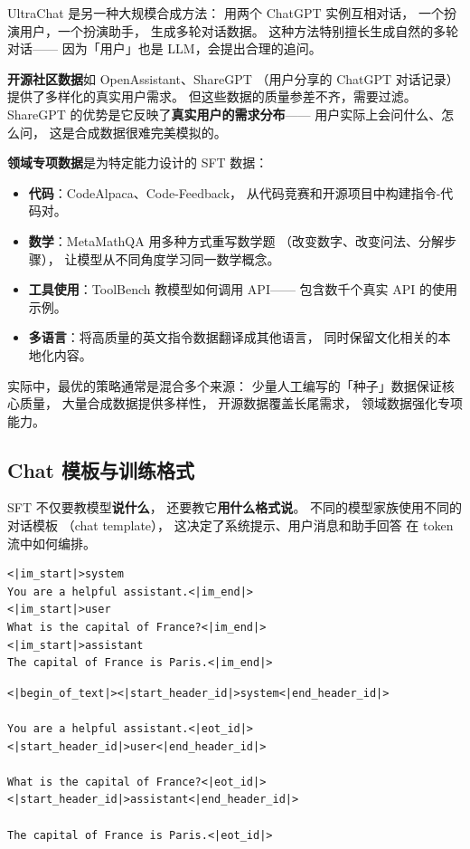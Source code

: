 
UltraChat 是另一种大规模合成方法：
用两个 ChatGPT 实例互相对话，
一个扮演用户，一个扮演助手，
生成多轮对话数据。
这种方法特别擅长生成自然的多轮对话——
因为「用户」也是 LLM，会提出合理的追问。

\textbf{开源社区数据}如 OpenAssistant、ShareGPT
（用户分享的 ChatGPT 对话记录）
提供了多样化的真实用户需求。
但这些数据的质量参差不齐，需要过滤。
ShareGPT 的优势是它反映了\textbf{真实用户的需求分布}——
用户实际上会问什么、怎么问，
这是合成数据很难完美模拟的。

\textbf{领域专项数据}是为特定能力设计的 SFT 数据：
\begin{itemize}[noitemsep]
  \item \textbf{代码}：CodeAlpaca、Code-Feedback，
        从代码竞赛和开源项目中构建指令-代码对。
  \item \textbf{数学}：MetaMathQA 用多种方式重写数学题
       （改变数字、改变问法、分解步骤），
        让模型从不同角度学习同一数学概念。
  \item \textbf{工具使用}：ToolBench 教模型如何调用 API——
        包含数千个真实 API 的使用示例。
  \item \textbf{多语言}：将高质量的英文指令数据翻译成其他语言，
        同时保留文化相关的本地化内容。
\end{itemize}

实际中，最优的策略通常是混合多个来源：
少量人工编写的「种子」数据保证核心质量，
大量合成数据提供多样性，
开源数据覆盖长尾需求，
领域数据强化专项能力。

\subsection{Chat 模板与训练格式}

SFT 不仅要教模型\textbf{说什么}，
还要教它\textbf{用什么格式说}。
不同的模型家族使用不同的对话模板
（chat template），
这决定了系统提示、用户消息和助手回答
在 token 流中如何编排。

\begin{lstlisting}[caption={ChatML format (used by GPT/Qwen)}]
<|im_start|>system
You are a helpful assistant.<|im_end|>
<|im_start|>user
What is the capital of France?<|im_end|>
<|im_start|>assistant
The capital of France is Paris.<|im_end|>
\end{lstlisting}

\begin{lstlisting}[caption={Llama 3 format}]
<|begin_of_text|><|start_header_id|>system<|end_header_id|>

You are a helpful assistant.<|eot_id|>
<|start_header_id|>user<|end_header_id|>

What is the capital of France?<|eot_id|>
<|start_header_id|>assistant<|end_header_id|>

The capital of France is Paris.<|eot_id|>
\end{lstlisting}

